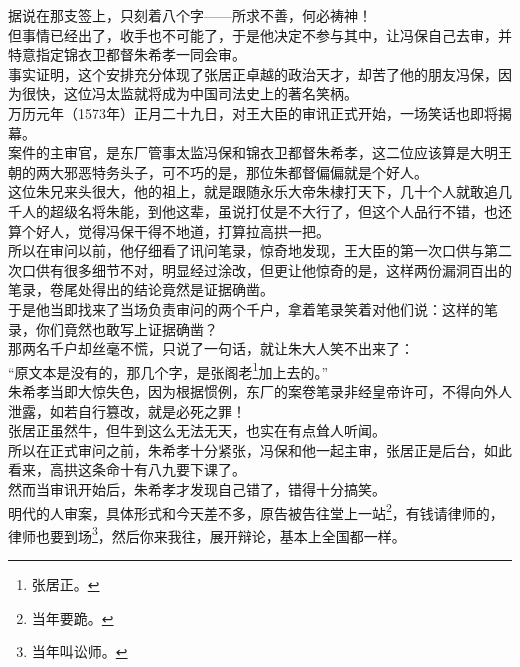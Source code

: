 \begin{multicols}{\theparacolNo}
据说在那支签上，只刻着八个字——所求不善，何必祷神！\\

但事情已经出了，收手也不可能了，于是他决定不参与其中，让冯保自己去审，并特意指定锦衣卫都督朱希孝一同会审。\\

事实证明，这个安排充分体现了张居正卓越的政治天才，却苦了他的朋友冯保，因为很快，这位冯太监就将成为中国司法史上的著名笑柄。\\

万历元年（1573年）正月二十九日，对王大臣的审讯正式开始，一场笑话也即将揭幕。\\

案件的主审官，是东厂管事太监冯保和锦衣卫都督朱希孝，这二位应该算是大明王朝的两大邪恶特务头子，可不巧的是，那位朱都督偏偏就是个好人。\\

这位朱兄来头很大，他的祖上，就是跟随永乐大帝朱棣打天下，几十个人就敢追几千人的超级名将朱能，到他这辈，虽说打仗是不大行了，但这个人品行不错，也还算个好人，觉得冯保干得不地道，打算拉高拱一把。\\

所以在审问以前，他仔细看了讯问笔录，惊奇地发现，王大臣的第一次口供与第二次口供有很多细节不对，明显经过涂改，但更让他惊奇的是，这样两份漏洞百出的笔录，卷尾处得出的结论竟然是证据确凿。\\

于是他当即找来了当场负责审问的两个千户，拿着笔录笑着对他们说：这样的笔录，你们竟然也敢写上证据确凿？\\

那两名千户却丝毫不慌，只说了一句话，就让朱大人笑不出来了：\\

“原文本是没有的，那几个字，是张阁老\footnote{张居正。}加上去的。”\\

朱希孝当即大惊失色，因为根据惯例，东厂的案卷笔录非经皇帝许可，不得向外人泄露，如若自行篡改，就是必死之罪！\\

张居正虽然牛，但牛到这么无法无天，也实在有点耸人听闻。\\

所以在正式审问之前，朱希孝十分紧张，冯保和他一起主审，张居正是后台，如此看来，高拱这条命十有八九要下课了。\\

然而当审讯开始后，朱希孝才发现自己错了，错得十分搞笑。\\

明代的人审案，具体形式和今天差不多，原告被告往堂上一站\footnote{当年要跪。}，有钱请律师的，律师也要到场\footnote{当年叫讼师。}，然后你来我往，展开辩论，基本上全国都一样。\\


\end{multicols}
